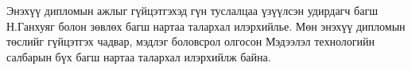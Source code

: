 
\begin{acknowledgements}
\addchaptertocentry{\acknowledgementname}

Энэхүү дипломын ажлыг гүйцэтгэхэд гүн туслалцаа үзүүлсэн удирдагч багш Н.Ганхуяг болон зөвлөх багш нартаа талархал илэрхийлье. Мөн энэхүү дипломын төслийг гүйцэтгэх чадвар, мэдлэг боловсрол олгосон Мэдээлэл технологийн салбарын бүх багш нартаа талархал илэрхийлж байна.


\end{acknowledgements}

